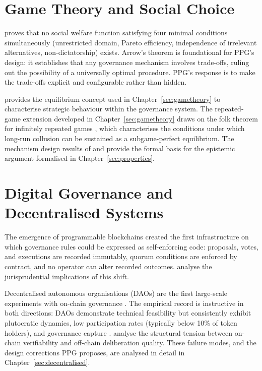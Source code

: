 \documentclass[12pt,a4paper,oneside]{report}
\begin{document}
\section{Game Theory and Social Choice}

\citet{arrow1951social} proves that no social welfare function satisfying four minimal conditions simultaneously (unrestricted domain, Pareto efficiency, independence of irrelevant alternatives, non-dictatorship) exists. Arrow's theorem is foundational for PPG's design: it establishes that any governance mechanism involves trade-offs, ruling out the possibility of a universally optimal procedure. PPG's response is to make the trade-offs explicit and configurable rather than hidden.

\citet{nash1950equilibrium} provides the equilibrium concept used in Chapter~\ref{sec:gametheory} to characterise strategic behaviour within the governance system. The repeated-game extension developed in Chapter~\ref{sec:gametheory} draws on the folk theorem for infinitely repeated games \citep{fudenberg1986folk}, which characterises the conditions under which long-run collusion can be sustained as a subgame-perfect equilibrium. The mechanism design results of \citet{hurwicz1973design} and \citet{maskin2008mechanism} provide the formal basis for the epistemic argument formalised in Chapter~\ref{sec:properties}.

\section{Digital Governance and Decentralised Systems}

The emergence of programmable blockchains \citep{buterin2014ethereum} created the first infrastructure on which governance rules could be expressed as self-enforcing code: proposals, votes, and executions are recorded immutably, quorum conditions are enforced by contract, and no operator can alter recorded outcomes. \citet{defilippi2018blockchain} analyse the jurisprudential implications of this shift.

Decentralised autonomous organisations (DAOs) are the first large-scale experiments with on-chain governance \citep{hassan2021decentralized}. The empirical record is instructive in both directions: DAOs demonstrate technical feasibility but consistently exhibit plutocratic dynamics, low participation rates (typically below 10\% of token holders), and governance capture \citep{chohan2017dao, siri2022daos}. \citet{reijers2021onchain} analyse the structural tension between on-chain verifiability and off-chain deliberation quality. These failure modes, and the design corrections PPG proposes, are analysed in detail in Chapter~\ref{sec:decentralised}.
\end{document}

